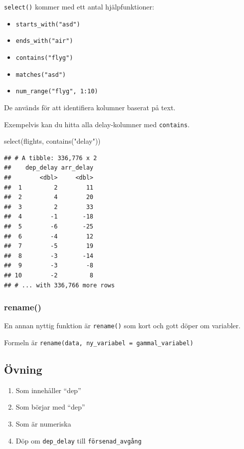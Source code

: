 \documentclass[
]{book}
\newenvironment{Shaded}{\begin{snugshade}}{\end{snugshade}}
\newcommand{\FunctionTok}[1]{\textcolor[rgb]{0.00,0.00,0.00}{#1}}
\newcommand{\NormalTok}[1]{#1}
\newcommand{\StringTok}[1]{\textcolor[rgb]{0.31,0.60,0.02}{#1}}
\providecommand{\tightlist}{%
  \setlength{\itemsep}{0pt}\setlength{\parskip}{0pt}}
\begin{document}
\texttt{select()} kommer med ett antal hjälpfunktioner:

\begin{itemize}
\tightlist
\item
  \texttt{starts\_with("asd")}
\item
  \texttt{ends\_with("air")}
\item
  \texttt{contains("flyg")}
\item
  \texttt{matches("asd")}
\item
  \texttt{num\_range("flyg",\ 1:10)}
\end{itemize}

De används för att identifiera kolumner baserat på text.

Exempelvis kan du hitta alla delay-kolumner med \texttt{contains}.

\begin{Shaded}
\begin{Highlighting}[]
\FunctionTok{select}\NormalTok{(flights, }\FunctionTok{contains}\NormalTok{(}\StringTok{"delay"}\NormalTok{))}
\end{Highlighting}
\end{Shaded}

\begin{verbatim}
## # A tibble: 336,776 x 2
##    dep_delay arr_delay
##        <dbl>     <dbl>
##  1         2        11
##  2         4        20
##  3         2        33
##  4        -1       -18
##  5        -6       -25
##  6        -4        12
##  7        -5        19
##  8        -3       -14
##  9        -3        -8
## 10        -2         8
## # ... with 336,766 more rows
\end{verbatim}

\hypertarget{rename}{%
\subsubsection{rename()}\label{rename}}

En annan nyttig funktion är \texttt{rename()} som kort och gott döper om variabler.

Formeln är \texttt{rename(data,\ ny\_variabel\ =\ gammal\_variabel)}

\hypertarget{uxf6vning-2}{%
\subsection{Övning}\label{uxf6vning-2}}

\begin{enumerate}
\def\labelenumi{\arabic{enumi}.}
\item
  Som innehåller ``dep''
\item
  Som börjar med ``dep''
\item
  Som är numeriska
\item
  Döp om \texttt{dep\_delay} till \texttt{försenad\_avgång}
\end{enumerate}
\end{document}
